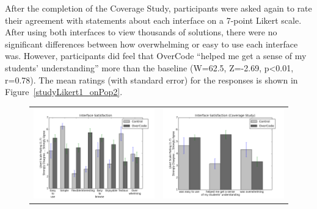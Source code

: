 After the completion of the Coverage Study, participants were asked again to rate their agreement with statements about each interface on a 7-point Likert scale. After using both interfaces to view thousands of solutions, there were no significant differences between how overwhelming or easy to use each interface was. However, participants did feel that OverCode ``helped me get a sense of my students' understanding'' more than the baseline (W=62.5, Z=-2.69, p<0.01, r=0.78). The mean ratings (with standard error) for the responses is shown in Figure~\ref{studyLikert1_onPop2}.

\begin{figure}
\centering
\begin{tabular}{c c}
\begin{minipage}{.6\linewidth}
\centering
\includegraphics[scale=0.35]{Body/figures/overcode/study2Likert.png}
\end{minipage}
&
\begin{minipage}{.4\linewidth}
\centering
\includegraphics[scale=0.30]{Body/figures/overcode/study1Likert_onPop2.png}

\end{minipage}
\end{tabular}
\end{figure}
